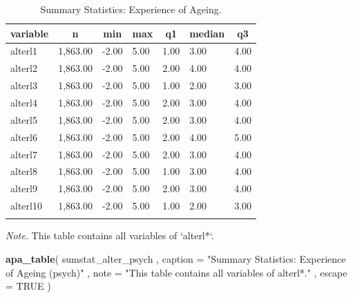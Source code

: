 \documentclass[
  doc]{apa6}
\newenvironment{Shaded}{\begin{snugshade}}{\end{snugshade}}
\newcommand{\AttributeTok}[1]{\textcolor[rgb]{0.13,0.29,0.53}{#1}}
\newcommand{\ConstantTok}[1]{\textcolor[rgb]{0.56,0.35,0.01}{#1}}
\newcommand{\FunctionTok}[1]{\textcolor[rgb]{0.13,0.29,0.53}{\textbf{#1}}}
\newcommand{\NormalTok}[1]{#1}
\newcommand{\StringTok}[1]{\textcolor[rgb]{0.31,0.60,0.02}{#1}}
\begin{document}
\begin{table}[tbp]

\begin{center}
\begin{threeparttable}

\caption{\label{tab:tabrstatix}Summary Statistics: Experience of Ageing.}

\begin{tabular}{lllllll}
\toprule
variable & \multicolumn{1}{c}{n} & \multicolumn{1}{c}{min} & \multicolumn{1}{c}{max} & \multicolumn{1}{c}{q1} & \multicolumn{1}{c}{median} & \multicolumn{1}{c}{q3}\\
\midrule
alterl1 & 1,863.00 & -2.00 & 5.00 & 1.00 & 3.00 & 4.00\\
alterl2 & 1,863.00 & -2.00 & 5.00 & 2.00 & 4.00 & 4.00\\
alterl3 & 1,863.00 & -2.00 & 5.00 & 1.00 & 2.00 & 3.00\\
alterl4 & 1,863.00 & -2.00 & 5.00 & 2.00 & 3.00 & 4.00\\
alterl5 & 1,863.00 & -2.00 & 5.00 & 2.00 & 3.00 & 4.00\\
alterl6 & 1,863.00 & -2.00 & 5.00 & 2.00 & 4.00 & 5.00\\
alterl7 & 1,863.00 & -2.00 & 5.00 & 2.00 & 3.00 & 4.00\\
alterl8 & 1,863.00 & -2.00 & 5.00 & 1.00 & 3.00 & 4.00\\
alterl9 & 1,863.00 & -2.00 & 5.00 & 2.00 & 3.00 & 4.00\\
alterl10 & 1,863.00 & -2.00 & 5.00 & 1.00 & 2.00 & 3.00\\
\bottomrule
\addlinespace
\end{tabular}

\begin{tablenotes}[para]
\normalsize{\textit{Note.} This table contains all variables of `alterl*`.}
\end{tablenotes}

\end{threeparttable}
\end{center}

\end{table}

\begin{Shaded}
\begin{Highlighting}[]
\FunctionTok{apa\_table}\NormalTok{(}
\NormalTok{  sumstat\_alter\_psych}
\NormalTok{  , }\AttributeTok{caption =} \StringTok{"Summary Statistics: Experience of Ageing (psych)"}
\NormalTok{  , }\AttributeTok{note =} \StringTok{"This table contains all variables of \textasciigrave{}alterl*\textasciigrave{}."}
\NormalTok{  , }\AttributeTok{escape =} \ConstantTok{TRUE}
\NormalTok{)}
\end{Highlighting}
\end{Shaded}
\end{document}
